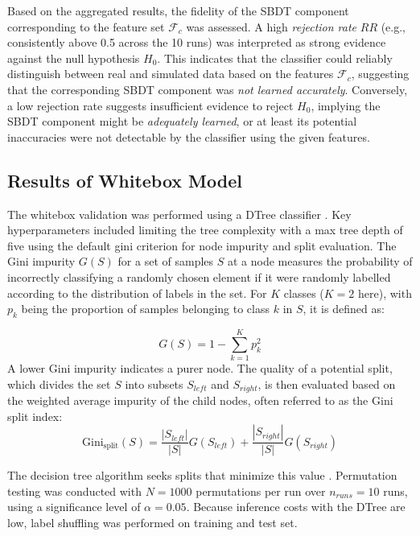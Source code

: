 Based on the aggregated results, the fidelity of the SBDT component corresponding to the feature set $\mathcal{F}_c$ was assessed. A high \textit{rejection rate} $RR$ (e.g., consistently above 0.5 across the 10 runs) was interpreted as strong evidence against the null hypothesis $H_0$. This indicates that the classifier could reliably distinguish between real and simulated data based on the features $\mathcal{F}_c$, suggesting that the corresponding SBDT component was \textit{not learned accurately}. Conversely, a low rejection rate suggests insufficient evidence to reject $H_0$, implying the SBDT component might be \textit{adequately learned}, or at least its potential inaccuracies were not detectable by the classifier using the given features.

\subsection*{Results of Whitebox Model}
\label{sec:results-whitebox}
The whitebox validation was performed using a DTree classifier \autocite{Scikit-Learn}. Key hyperparameters included limiting the tree complexity with a max tree depth of five using the default gini criterion for node impurity and split evaluation. The Gini impurity $G(S)$ for a set of samples $S$ at a node measures the probability of incorrectly classifying a randomly chosen element if it were randomly labelled according to the distribution of labels in the set. For $K$ classes ($K = 2$ here), with $p_k$ being the proportion of samples belonging to class $k$ in $S$, it is defined as:

\begin{equation}
  G(S) = 1 - \sum_{k=1}^{K} p_k^2
  \label{eq:gini_impurity}
\end{equation}
A lower Gini impurity indicates a purer node. The quality of a potential split, which divides the set $S$ into subsets $S_{left}$ and $S_{right}$, is then evaluated based on the weighted average impurity of the child nodes, often referred to as the Gini split index:
\begin{equation}
  \text{Gini}_{\text{split}}(S) = \frac{|S_{left}|}{|S|} G(S_{left}) + \frac{|S_{right}|}{|S|} G(S_{right})
  \label{eq:gini_split}
\end{equation}

The decision tree algorithm seeks splits that minimize this value \autocite{breiman1984classification}. Permutation testing was conducted with $N = 1000$ permutations per run over $n_{runs}=10$ runs, using a significance level of $\alpha = 0.05$. Because inference costs with the DTree are low, label shuffling was performed on training and test set.

